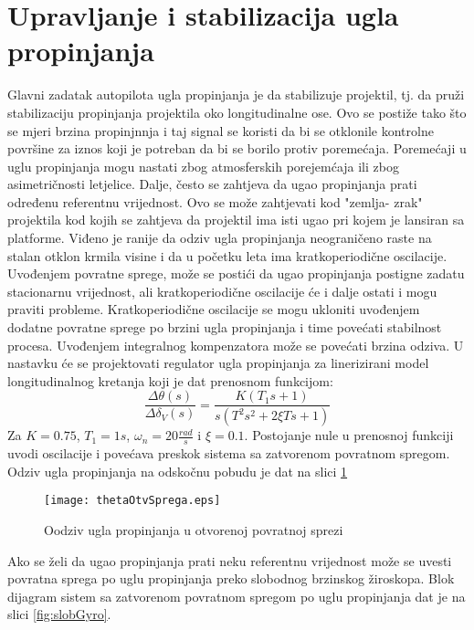 \section{Upravljanje i stabilizacija ugla propinjanja}
Glavni zadatak autopilota ugla propinjanja je da stabilizuje projektil, tj. da 
pruži stabilizaciju propinjanja projektila oko longitudinalne ose. Ovo se postiže tako 
što se mjeri brzina propinjnnja i taj signal se koristi da bi se otklonile 
kontrolne površine za iznos koji je potreban da bi se borilo protiv poremećaja. 
Poremećaji u uglu propinjanja mogu nastati zbog atmosferskih porejemćaja ili 
zbog asimetričnosti letjelice. Dalje, često se zahtjeva da ugao propinjanja prati 
određenu referentnu vrijednost. Ovo se može zahtjevati kod "zemlja- zrak" projektila 
kod kojih se zahtjeva da projektil ima isti ugao pri kojem je lansiran sa platforme. 
Viđeno je ranije da odziv ugla propinjanja neograničeno raste na stalan otklon krmila visine 
i da u početku leta ima kratkoperiodične oscilacije. Uvođenjem povratne sprege,
može se postići da ugao propinjanja postigne zadatu stacionarnu vrijednost, ali kratkoperiodične 
oscilacije će i dalje ostati i mogu praviti probleme. Kratkoperiodične 
oscilacije se mogu ukloniti uvođenjem dodatne povratne sprege po brzini ugla propinjanja 
i time povećati stabilnost procesa. Uvođenjem integralnog kompenzatora može se povećati brzina odziva.
U nastavku će se projektovati regulator ugla propinjanja za linerizirani model longitudinalnog kretanja 
koji je dat prenosnom funkcijom:
\begin{equation}
    \frac{\Delta \theta(s)}{\Delta \delta_V(s)}=\frac{K(T_1s+1)}{s(T^2s^2+2\xi Ts+1)}
\end{equation}
Za $K=0.75$, $T_1 = 1s$, $\omega _n = 20 \frac{rad}{s}$ i $\xi = 0.1$. 
Postojanje nule u prenosnoj funkciji uvodi oscilacije i povećava preskok sistema sa 
zatvorenom povratnom spregom. Odziv ugla propinjanja na odskočnu pobudu  je dat na 
slici \ref{fig:propinj}
\begin{figure}[!ht]
    \centering
    \texttt{[image: thetaOtvSprega.eps]}
    \caption{Oodziv ugla propinjanja u otvorenoj povratnoj sprezi}
    \label{fig:propinj}
\end{figure} 
Ako se želi da ugao propinjanja prati neku referentnu vrijednost može se uvesti 
povratna sprega po uglu propinjanja preko slobodnog brzinskog žiroskopa. Blok dijagram sistem sa zatvorenom 
povratnom spregom po uglu propinjanja dat je na slici \ref{fig:slobGyro}.
